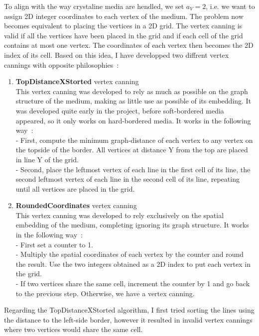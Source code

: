 \documentclass{report}
\begin{document}
To align with the way crystaline media are hendled, we set $a_V = 2$, i.e. we want to assign 2D integer coordinates to each vertex of the medium. The problem now becomes equivalent to placing the vertices in a 2D grid. The vertex canning is valid if all the vertices have been placed in the grid and if each cell of the grid contains at most one vertex. The coordinates of each vertex then becomes the 2D index of its cell. Based on this idea, I have developped two diffrent vertex cannings with opposite philosophies~:
\begin{enumerate}
	\item \textbf{TopDistanceXStorted} vertex canning\\
	This vertex canning was developed to rely as much as possible on the graph structure of the medium, making as little use as possible of its embedding. It was developed quite early in the project, before soft-bordered media appeared, so it only works on hard-bordered media. It works in the following way~:\\
	- First, compute the minimum graph-distance of each vertex to any vertex on the topside of the border. All vertices at distance Y from the top are placed in line Y of the grid.\\
	- Second, place the leftmost vertex of each line in the first cell of its line, the second leftmost vertex of each line in the second cell of its line, repeating until all vertices are placed in the grid.
	
	\item \textbf{RoundedCoordinates} vertex canning\\
	This vertex canning was developed to rely exclusively on the spatial embedding of the medium, completing ignoring its graph structure. It works in the following way~:\\
	- First set a counter to 1.\\
	- Multiply the spatial coordinates of each vertex by the counter and round the result. Use the two integers obtained as a 2D index to put each vertex in the grid.\\
	- If two vertices share the same cell, increment the counter by 1 and go back to the previous step. Otherwise, we have a vertex canning.
\end{enumerate}

Regarding the TopDistanceXStorted algorithm, I first tried sorting the lines using the distance to the left-side border, however it resulted in invalid vertex cannings where two vertices would share the same cell.
\end{document}
